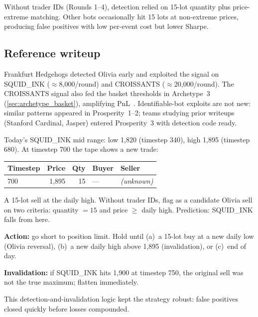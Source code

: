\begin{pitfallbox}
Without trader IDs (Rounds 1--4), detection relied on 15-lot
quantity plus price-extreme matching.  Other bots occasionally hit
15 lots at non-extreme prices, producing false positives with low
per-event cost but lower Sharpe.
\end{pitfallbox}

\subsection{Reference writeup}

Frankfurt Hedgehogs detected Olivia early and exploited the signal
on SQUID\_INK ($\approx$8{,}000/round) and CROISSANTS
($\approx$20{,}000/round).  The CROISSANTS signal also fed the
basket thresholds in Archetype~3 (\cref{sec:archetype_basket}),
amplifying PnL~\citep{frankfurthedgehogs2025}.  Identifiable-bot
exploits are not new: similar patterns appeared in Prosperity~1--2;
teams studying prior writeups (Stanford Cardinal, Jasper) entered
Prosperity~3 with detection code ready.

\begin{prosperitybox}[title={Detecting Olivia on SQUID\_INK}]
Today's SQUID\_INK mid range: low 1{,}820 (timestep 340), high
1{,}895 (timestep 680).  At timestep 700 the tape shows a new trade:

\medskip
\begin{tabular}{lrrll}
\toprule
\textbf{Timestep} & \textbf{Price} & \textbf{Qty} & \textbf{Buyer} &
\textbf{Seller} \\
\midrule
700 & 1{,}895 & 15 & --- & \textit{(unknown)} \\
\bottomrule
\end{tabular}
\medskip

A 15-lot sell at the daily high.  Without trader IDs, flag as a
candidate Olivia sell on two criteria: quantity $= 15$ and price
$\geq$ daily high.  Prediction: SQUID\_INK falls from here.

\textbf{Action:} go short to position limit.  Hold until (a)~a 15-lot
buy at a new daily low (Olivia reversal), (b)~a new daily high above
1{,}895 (invalidation), or (c)~end of day.

\textbf{Invalidation:} if SQUID\_INK hits 1{,}900 at timestep 750,
the original sell was not the true maximum; flatten immediately.

This detection-and-invalidation logic kept the strategy robust:
false positives closed quickly before losses compounded.
\end{prosperitybox}

